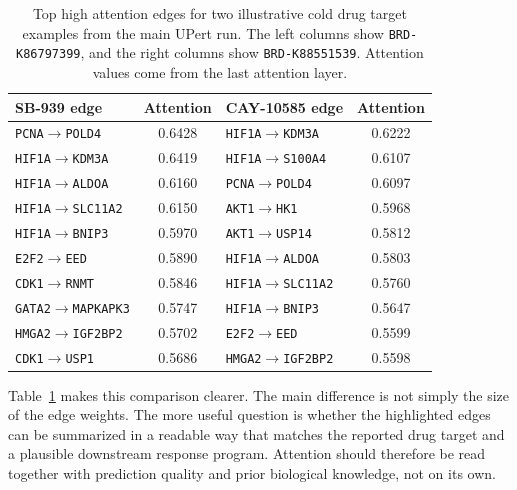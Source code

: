 \begin{table}[htbp]
\centering
\caption[Cold Drug Target Case Edges]{Top high attention edges for two illustrative cold drug target examples from the main UPert run. The left columns show \texttt{BRD-K86797399}, and the right columns show \texttt{BRD-K88551539}. Attention values come from the last attention layer.}
\label{tab:attention_cold_drug_target_best_worst}
\begin{tabular}{lclc}
\hline
SB-939 edge & Attention & CAY-10585 edge & Attention \\
\hline
\texttt{PCNA}$\rightarrow$\texttt{POLD4} & 0.6428 & \texttt{HIF1A}$\rightarrow$\texttt{KDM3A} & 0.6222 \\
\texttt{HIF1A}$\rightarrow$\texttt{KDM3A} & 0.6419 & \texttt{HIF1A}$\rightarrow$\texttt{S100A4} & 0.6107 \\
\texttt{HIF1A}$\rightarrow$\texttt{ALDOA} & 0.6160 & \texttt{PCNA}$\rightarrow$\texttt{POLD4} & 0.6097 \\
\texttt{HIF1A}$\rightarrow$\texttt{SLC11A2} & 0.6150 & \texttt{AKT1}$\rightarrow$\texttt{HK1} & 0.5968 \\
\texttt{HIF1A}$\rightarrow$\texttt{BNIP3} & 0.5970 & \texttt{AKT1}$\rightarrow$\texttt{USP14} & 0.5812 \\
\texttt{E2F2}$\rightarrow$\texttt{EED} & 0.5890 & \texttt{HIF1A}$\rightarrow$\texttt{ALDOA} & 0.5803 \\
\texttt{CDK1}$\rightarrow$\texttt{RNMT} & 0.5846 & \texttt{HIF1A}$\rightarrow$\texttt{SLC11A2} & 0.5760 \\
\texttt{GATA2}$\rightarrow$\texttt{MAPKAPK3} & 0.5747 & \texttt{HIF1A}$\rightarrow$\texttt{BNIP3} & 0.5647 \\
\texttt{HMGA2}$\rightarrow$\texttt{IGF2BP2} & 0.5702 & \texttt{E2F2}$\rightarrow$\texttt{EED} & 0.5599 \\
\texttt{CDK1}$\rightarrow$\texttt{USP1} & 0.5686 & \texttt{HMGA2}$\rightarrow$\texttt{IGF2BP2} & 0.5598 \\
\hline
\end{tabular}
\end{table}

\noindent Table~\ref{tab:attention_cold_drug_target_best_worst} makes this comparison clearer. The main difference is not simply the size of the edge weights. The more useful question is whether the highlighted edges can be summarized in a readable way that matches the reported drug target and a plausible downstream response program. Attention should therefore be read together with prediction quality and prior biological knowledge, not on its own.


